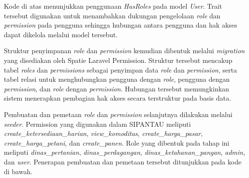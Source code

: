 Kode di atas menunjukkan penggunaan \textit{HasRoles} pada model \textit{User}. Trait tersebut digunakan untuk menambahkan dukungan pengelolaan \textit{role} dan \textit{permission} pada pengguna sehingga hubungan antara pengguna dan hak akses dapat dikelola melalui model tersebut.

Struktur penyimpanan \textit{role} dan \textit{permission} kemudian dibentuk melalui \textit{migration} yang disediakan oleh Spatie Laravel Permission. Struktur tersebut mencakup tabel \textit{roles} dan \textit{permissions} sebagai penyimpan data \textit{role} dan \textit{permission}, serta tabel relasi untuk menghubungkan pengguna dengan \textit{role}, pengguna dengan \textit{permission}, dan \textit{role} dengan \textit{permission}. Hubungan tersebut memungkinkan sistem menerapkan pembagian hak akses secara terstruktur pada basis data.

Pembuatan dan pemetaan \textit{role} dan \textit{permission} selanjutnya dilakukan melalui \textit{seeder}. Permission yang digunakan dalam SIPANTAU meliputi \textit{create\_ketersediaan\_harian}, \textit{view\_komoditas}, \textit{create\_harga\_pasar}, \textit{create\_harga\_petani}, dan \textit{create\_panen}. Role yang dibentuk pada tahap ini meliputi \textit{dinas\_pertanian}, \textit{dinas\_perdagangan}, \textit{dinas\_ketahanan\_pangan}, \textit{admin}, dan \textit{user}. Penerapan pembuatan dan pemetaan tersebut ditunjukkan pada kode di bawah.

\begin{code}
\end{code}

